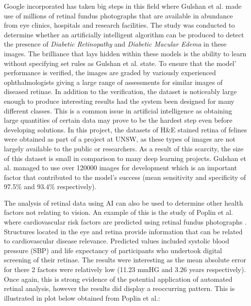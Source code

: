\documentclass[a4paper]{article}
\begin{document}
        Google incorporated has taken big steps in this field where Gulshan et al. \cite{RN6} made use of millions of retinal fundus photographs that are available in abundance from eye clinics, hospitals and research facilities. The study was conducted to determine whether an artificially intelligent algorithm can be produced to detect the presence of \textit{Diabetic Retinopathy} and \textit{Diabetic Macular Edema} in these images. The brilliance that lays hidden within these models is the ability to learn without specifying set rules as Gulshan et al. \cite{RN6} state. To ensure that the model' performance is verified, the images are graded by variously experienced ophthalmologists giving a large range of assessments for similar images of diseased retinae. In addition to the verification, the dataset is noticeably large enough to produce interesting results had the system been designed for many different classes. This is a common issue in artificial intelligence as obtaining large quantities of certain data may prove to be the hardest step even before developing solutions. In this project, the datasets of H\&E stained retina of felines were obtained as part of a project at UNSW, as these types of images are not largely available to the public or researchers. As a result of this scarcity, the size of this dataset is small in comparison to many deep learning projects. Gulshan et al. \cite{RN6} managed to use over 120000 images for development which is an important factor that contributed to the model's success (mean sensitivity and specificity of 97.5\% and 93.4\% respectively).
        \vspace{3mm}

        The analysis of retinal data using AI can also be used to determine other health factors not relating to vision. An example of this is the study of Poplin et al. where cardiovascular risk factors are predicted using retinal fundus photographs \cite{RN15}. Structures located in the eye and retina provide information that can be related to cardiovascular disease relevance. Predicted values included systolic blood pressure (SBP) and life expectancy of participants who undertook digital screening of their retinae. The results were interesting as the mean absolute error for there 2 factors were relatively low (11.23 mmHG and 3.26 years respectively). Once again, this is strong evidence of the potential application of automated retinal analysis, however the results did display a reoccurring pattern. This is illustrated in plot below obtained from Poplin et al.:
        \vspace{3mm}
\end{document}
